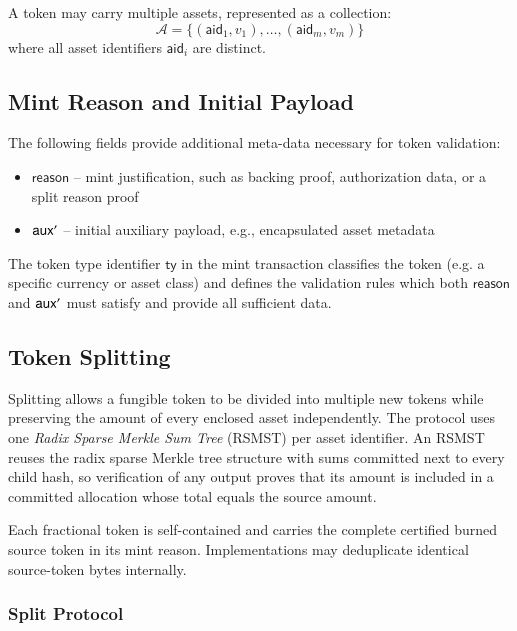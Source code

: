 A token may carry multiple assets, represented as a collection:
\[
\mathcal{A} = \{(\mathsf{aid}_1, v_1), \ldots, (\mathsf{aid}_m, v_m)\}
\]
where all asset identifiers $\mathsf{aid}_i$ are distinct.

\subsection{Mint Reason and Initial Payload}\label{sec:mint-justification}

The following fields provide additional meta-data necessary for token validation:
\begin{itemize}
	\item $\mathsf{reason}$ -- mint justification, such as backing proof, authorization data, or a split reason proof
	\item $\mathsf{aux}'$ -- initial auxiliary payload, e.g., encapsulated asset metadata
\end{itemize}

The token type identifier $\mathsf{ty}$ in the mint transaction classifies the token (e.g. a specific currency or asset class) and defines the validation rules which both $\mathsf{reason}$ and $\mathsf{aux}'$ must satisfy and provide all sufficient data.

\subsection{Token Splitting}\label{sec:token-splitting}

Splitting allows a fungible token to be divided into multiple new tokens while preserving the amount of every enclosed asset independently.  The protocol uses one \emph{Radix Sparse Merkle Sum Tree} (RSMST) per asset identifier.  An RSMST reuses the radix sparse Merkle tree structure with sums committed next to every child hash, so verification of any output proves that its amount is included in a committed allocation whose total equals the source amount.

Each fractional token is self-contained and carries the complete certified burned source token in its mint reason. Implementations may deduplicate identical source-token bytes internally.

\subsubsection{Split Protocol}

